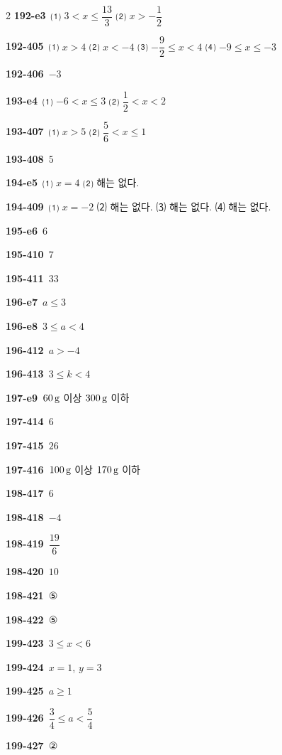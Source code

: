 \documentclass[10pt,a4paper]{article}
\begin{document}
\begin{multicols}{2}
\noindent\textbf{192-e3}\ ⑴ $3<x\le\dfrac{13}{3}$ ⑵ $x>-\dfrac{1}{2}$\par
\noindent\textbf{192-405}\ ⑴ $x>4$ ⑵ $x<-4$ ⑶ $-\dfrac{9}{2}\le x<4$ ⑷ $-9\le x\le -3$\par
\noindent\textbf{192-406}\ $-3$\par
\noindent\textbf{193-e4}\ ⑴ $-6<x\le 3$ ⑵ $\dfrac{1}{2}<x<2$\par
\noindent\textbf{193-407}\ ⑴ $x>5$ ⑵ $\dfrac{5}{6}<x\le 1$\par
\noindent\textbf{193-408}\ $5$\par
\noindent\textbf{194-e5}\ ⑴ $x=4$ ⑵ 해는 없다.\par
\noindent\textbf{194-409}\ ⑴ $x=-2$ ⑵ 해는 없다. ⑶ 해는 없다. ⑷ 해는 없다.\par
\noindent\textbf{195-e6}\ $6$\par
\noindent\textbf{195-410}\ $7$\par
\noindent\textbf{195-411}\ $33$\par
\noindent\textbf{196-e7}\ $a\le 3$\par
\noindent\textbf{196-e8}\ $3\le a<4$\par
\noindent\textbf{196-412}\ $a>-4$\par
\noindent\textbf{196-413}\ $3\le k<4$\par
\noindent\textbf{197-e9}\ $60\mkern3mu \mathrm{g}$ 이상 $300\mkern3mu \mathrm{g}$ 이하\par
\noindent\textbf{197-414}\ $6$\par
\noindent\textbf{197-415}\ $26$\par
\noindent\textbf{197-416}\ $100\mkern3mu \mathrm{g}$ 이상 $170\mkern3mu \mathrm{g}$ 이하\par
\noindent\textbf{198-417}\ $6$\par
\noindent\textbf{198-418}\ $-4$\par
\noindent\textbf{198-419}\ $\dfrac{19}{6}$\par
\noindent\textbf{198-420}\ $10$\par
\noindent\textbf{198-421}\ ⑤\par
\noindent\textbf{198-422}\ ⑤\par
\noindent\textbf{199-423}\ $3\le x<6$\par
\noindent\textbf{199-424}\ $x=1$, $y=3$\par
\noindent\textbf{199-425}\ $a\ge 1$\par
\noindent\textbf{199-426}\ $\dfrac{3}{4}\le a<\dfrac{5}{4}$\par
\noindent\textbf{199-427}\ ②\par

\end{multicols}
\end{document}
